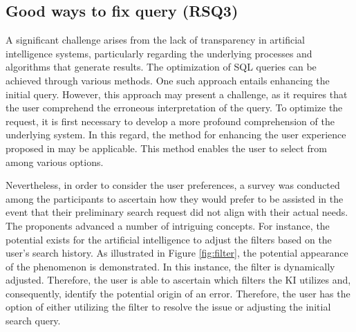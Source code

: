 \documentclass[../../submission.tex]{subfiles}
\begin{document}
 \subsection{Good ways to fix query (RSQ3)}
 A significant challenge arises from the lack of transparency in artificial intelligence systems, 
 particularly regarding the underlying processes and algorithms that generate results. 
 The optimization of SQL queries can be achieved through various methods. 
 One such approach entails enhancing the initial query. However, this approach may present a challenge, as it requires that the user comprehend the erroneous interpretation of the query. 
 To optimize the request, it is first necessary to develop a more profound comprehension of the underlying system. 
 In this regard, the method for enhancing the user experience proposed in \cite{popescuEtalTowardsTheoryOfNaturalLanguage} may be applicable. 
 This method enables the user to select from among various options.  


 Nevertheless, in order to consider the user preferences, a survey was conducted among the participants to ascertain how they would prefer to be assisted in the event that their preliminary search request did not align with their actual needs.
 The proponents advanced a number of intriguing concepts. For instance, the potential exists for the artificial intelligence to adjust the filters 
 based on the user's search history. As illustrated in Figure \ref{fig:filter}, the potential appearance of the phenomenon is 
 demonstrated. In this instance, the filter is dynamically adjusted. Therefore, the user is able to ascertain 
 which filters the KI utilizes and, consequently, identify the potential origin of an error. Therefore, the user 
 has the option of either utilizing the filter to resolve the issue or adjusting the initial search query.
 
\end{document}

